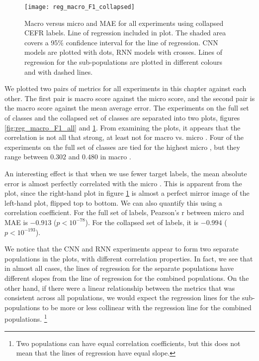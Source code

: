 \begin{figure}
  \centering
  \texttt{[image: reg\_macro\_F1\_collapsed]}
  \caption[Macro \FI versus micro \FI and MAE]{
    Macro \FI versus micro \FI and MAE for all experiments using collapsed
    CEFR labels. Line of regression included in plot. The shaded area covers
    a 95\% confidence interval for the line of regression. CNN models are
    plotted with dots, RNN models with crosses. Lines of regression for the
    sub-populations are plotted in different colours and with dashed lines.
  }
  \label{fig:reg_macro_F1_collapsed}
\end{figure}

We plotted two pairs of metrics for all experiments in this chapter against
each other. The first pair is macro \FI score against the micro \FI score,
and the second pair is the macro \FI score against the mean average error.
The experiments on the full set of classes and the collapsed set of classes
are separated into two plots, figures \ref{fig:reg_macro_F1_all} and
\ref{fig:reg_macro_F1_collapsed}. From examining the plots, it appears that
the correlation is not all that strong, at least not for macro \FI vs. micro
\FI. Four of the experiments on the full set of classes are tied for the
highest micro \FI, but they range between $0.302$ and $0.480$ in macro \FI.

An interesting effect is that when we use fewer target labels, the mean
absolute error is almost perfectly correlated with the micro \FI. This is
apparent from the plot, since the right-hand plot in figure
\ref{fig:reg_macro_F1_collapsed} is almost a perfect mirror image of the
left-hand plot, flipped top to bottom. We can also quantify this using a
correlation coefficient. For the full set of labels, Pearson's r between
micro \FI and MAE is $-0.913$ ($p < 10^{-78}$). For the collapsed set of
labels, it is $-0.994$ ($p < 10^{-193}$). 

We notice that the CNN and RNN experiments appear to form two separate
populations in the plots, with different correlation properties. In fact, we
see that in almost all cases, the lines of regression for the separate
populations have different slopes from the line of regression for the
combined populations. On the other hand, if there were a linear relationship
between the metrics that was consistent across all populations, we would
expect the regression lines for the sub-populations to be more or less
collinear with the regression line for the combined populations.
\footnote{Two populations can have equal correlation coefficients, but this
does not mean that the lines of regression have equal slope.}

